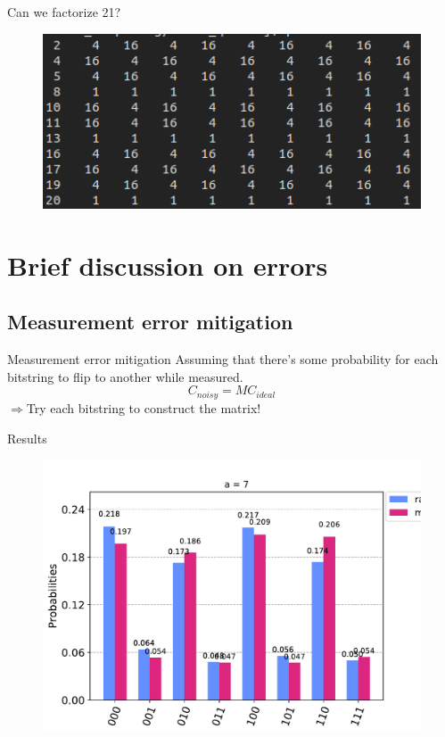 \documentclass{beamer}
\begin{document}
\begin{frame}{Can we factorize 21?}
	\begin{figure}[h]
		\centering
		\includegraphics[width=0.8\linewidth]{./figs/21cases.png}
	\end{figure}
	
\end{frame}

\section{Brief discussion on errors}%

\subsection{Measurement error mitigation}%

\begin{frame}{Measurement error mitigation}
		Assuming that there's some probability for each bitstring to flip to 
		another while measured.	
		\begin{equation*}
			C_{noisy} = M C_{ideal}
		\end{equation*}
		$\Rightarrow$Try each bitstring to construct the matrix!
		
\end{frame}

\begin{frame}{Results}
	\begin{figure}[h]
		\centering
		\includegraphics[width=0.8\linewidth]{./figs/error_mitigation_7_cambridge.pdf}
	\end{figure}
\end{frame}
\end{document}
